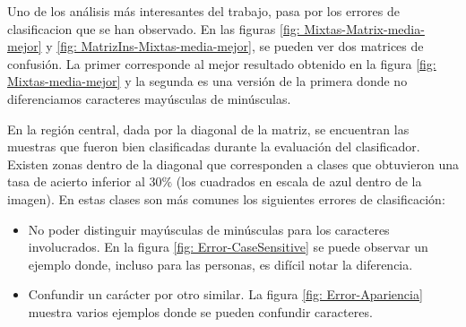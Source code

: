 	Uno de los análisis más interesantes del trabajo, pasa por los errores de clasificacion que se han observado. En las figuras \ref{fig: Mixtas-Matrix-media-mejor} y \ref{fig: MatrizIns-Mixtas-media-mejor}, se pueden ver dos matrices de confusión. La primer corresponde al mejor resultado obtenido en la figura \ref{fig: Mixtas-media-mejor} y la segunda es una versión de la primera donde no diferenciamos caracteres mayúsculas de minúsculas.

	En la región central, dada por la diagonal de la matriz, se encuentran las muestras que fueron bien clasificadas durante la evaluación del clasificador. Existen zonas dentro de la diagonal que corresponden a clases que obtuvieron una tasa de acierto inferior al $30\%$ (los cuadrados en escala de azul dentro de la imagen). En estas clases son más comunes los siguientes errores de clasificación:

	\begin{itemize}
		\item No poder distinguir mayúsculas de minúsculas para los caracteres involucrados. En la figura \ref{fig: Error-CaseSensitive} se puede observar un ejemplo donde, incluso para las personas, es difícil notar la diferencia.
		\item Confundir un carácter por otro similar. La figura \ref{fig: Error-Apariencia} muestra varios ejemplos donde se pueden confundir caracteres.
	\end{itemize}

